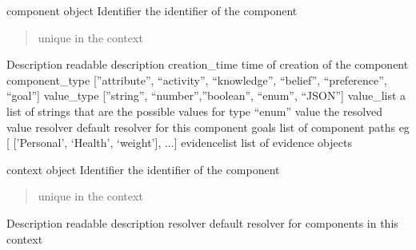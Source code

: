 \documentclass[letterpaper,10pt,english]{sphinxmanual}
\begin{document}
\begin{fulllineitems}
\label{personis.client:personis.client.Component}
component object
Identifier  the identifier of the component
\begin{quote}

unique in the context
\end{quote}

Description readable description
creation\_time   time of creation of the component
component\_type  {[}''attribute'', ``activity'', ``knowledge'', ``belief'', ``preference'', ``goal''{]}
value\_type  {[}''string'', ``number'',''boolean'', ``enum'', ``JSON''{]}
value\_list    a list of strings that are the possible values for type ``enum''
value       the resolved value
resolver    default resolver for this component
goals       list of component paths eg {[} {[}'Personal', `Health', `weight'{]}, ...{]}
evidencelist    list of evidence objects

\end{fulllineitems}


\begin{fulllineitems}
\label{personis.client:personis.client.Context}
context object
Identifier  the identifier of the component
\begin{quote}

unique in the context
\end{quote}

Description readable description
resolver    default resolver for components in this context

\end{fulllineitems}

\end{document}
